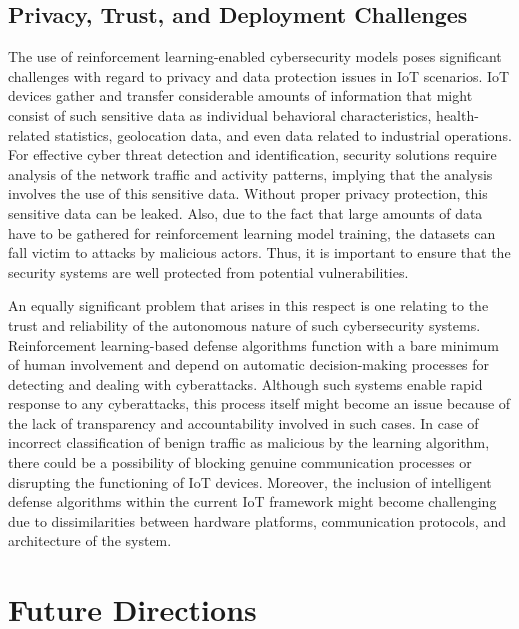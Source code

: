\documentclass[12pt]{article}
\begin{document}
\subsection{Privacy, Trust, and Deployment Challenges}
The use of reinforcement learning-enabled cybersecurity models poses significant challenges with regard to privacy and data protection issues in IoT scenarios. IoT devices gather and transfer considerable amounts of information that might consist of such sensitive data as individual behavioral characteristics, health-related statistics, geolocation data, and even data related to industrial operations. For effective cyber threat detection and identification, security solutions require analysis of the network traffic and activity patterns, implying that the analysis involves the use of this sensitive data. Without proper privacy protection, this sensitive data can be leaked. Also, due to the fact that large amounts of data have to be gathered for reinforcement learning model training, the datasets can fall victim to attacks by malicious actors. Thus, it is important to ensure that the security systems are well protected from potential vulnerabilities.\cite{Farooq2025}



An equally significant problem that arises in this respect is one relating to the trust and reliability of the autonomous nature of such cybersecurity systems. Reinforcement learning-based defense algorithms function with a bare minimum of human involvement and depend on automatic decision-making processes for detecting and dealing with cyberattacks. Although such systems enable rapid response to any cyberattacks, this process itself might become an issue because of the lack of transparency and accountability involved in such cases. In case of incorrect classification of benign traffic as malicious by the learning algorithm, there could be a possibility of blocking genuine communication processes or disrupting the functioning of IoT devices. Moreover, the inclusion of intelligent defense algorithms within the current IoT framework might become challenging due to dissimilarities between hardware platforms, communication protocols, and architecture of the system.\cite{Cevallos2023, Khan2023, Sharma2023}
	

	\section{Future Directions}
\end{document}

